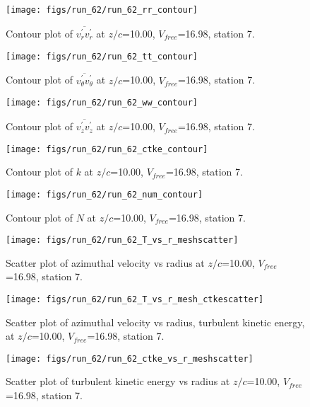 \begin{figure}[H]
\centering
\texttt{[image: figs/run\_62/run\_62\_rr\_contour]}
\caption{Contour plot of $\overline{v_{r}^{\prime} v_{r}^{\prime}}$ at $z/c$=10.00, $V_{free}$=16.98, station 7.}
\end{figure}


\begin{figure}[H]
\centering
\texttt{[image: figs/run\_62/run\_62\_tt\_contour]}
\caption{Contour plot of $\overline{v_{\theta}^{\prime} v_{\theta}^{\prime}}$ at $z/c$=10.00, $V_{free}$=16.98, station 7.}
\end{figure}


\begin{figure}[H]
\centering
\texttt{[image: figs/run\_62/run\_62\_ww\_contour]}
\caption{Contour plot of $\overline{v_{z}^{\prime} v_{z}^{\prime}}$ at $z/c$=10.00, $V_{free}$=16.98, station 7.}
\end{figure}


\begin{figure}[H]
\centering
\texttt{[image: figs/run\_62/run\_62\_ctke\_contour]}
\caption{Contour plot of $k$ at $z/c$=10.00, $V_{free}$=16.98, station 7.}
\end{figure}


\begin{figure}[H]
\centering
\texttt{[image: figs/run\_62/run\_62\_num\_contour]}
\caption{Contour plot of $N$ at $z/c$=10.00, $V_{free}$=16.98, station 7.}
\end{figure}


\begin{figure}[H]
\centering
\texttt{[image: figs/run\_62/run\_62\_T\_vs\_r\_meshscatter]}
\caption{Scatter plot of azimuthal velocity vs radius at $z/c$=10.00, $V_{free}$=16.98, station 7.}
\end{figure}


\begin{figure}[H]
\centering
\texttt{[image: figs/run\_62/run\_62\_T\_vs\_r\_mesh\_ctkescatter]}
\caption{Scatter plot of azimuthal velocity vs radius, turbulent kinetic energy, at $z/c$=10.00, $V_{free}$=16.98, station 7.}
\end{figure}


\begin{figure}[H]
\centering
\texttt{[image: figs/run\_62/run\_62\_ctke\_vs\_r\_meshscatter]}
\caption{Scatter plot of turbulent kinetic energy vs radius at $z/c$=10.00, $V_{free}$=16.98, station 7.}
\end{figure}


